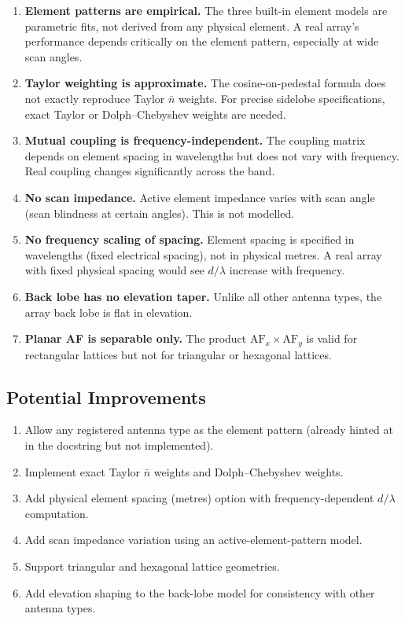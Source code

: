 \documentclass[11pt,a4paper]{article}
\begin{document}
\begin{enumerate}[nosep]
    \item \textbf{Element patterns are empirical.} The three built-in element models are parametric fits, not derived from any physical element. A real array's performance depends critically on the element pattern, especially at wide scan angles.
    \item \textbf{Taylor weighting is approximate.} The cosine-on-pedestal formula does not exactly reproduce Taylor $\bar{n}$ weights. For precise sidelobe specifications, exact Taylor or Dolph--Chebyshev weights are needed.
    \item \textbf{Mutual coupling is frequency-independent.} The coupling matrix depends on element spacing in wavelengths but does not vary with frequency. Real coupling changes significantly across the band.
    \item \textbf{No scan impedance.} Active element impedance varies with scan angle (scan blindness at certain angles). This is not modelled.
    \item \textbf{No frequency scaling of spacing.} Element spacing is specified in wavelengths (fixed electrical spacing), not in physical metres. A real array with fixed physical spacing would see $d/\lambda$ increase with frequency.
    \item \textbf{Back lobe has no elevation taper.} Unlike all other antenna types, the array back lobe is flat in elevation.
    \item \textbf{Planar AF is separable only.} The product $\text{AF}_x \times \text{AF}_y$ is valid for rectangular lattices but not for triangular or hexagonal lattices.
\end{enumerate}

\subsection{Potential Improvements}

\begin{enumerate}[nosep]
    \item Allow any registered antenna type as the element pattern (already hinted at in the docstring but not implemented).
    \item Implement exact Taylor $\bar{n}$ weights and Dolph--Chebyshev weights.
    \item Add physical element spacing (metres) option with frequency-dependent $d/\lambda$ computation.
    \item Add scan impedance variation using an active-element-pattern model.
    \item Support triangular and hexagonal lattice geometries.
    \item Add elevation shaping to the back-lobe model for consistency with other antenna types.
\end{enumerate}
\end{document}
